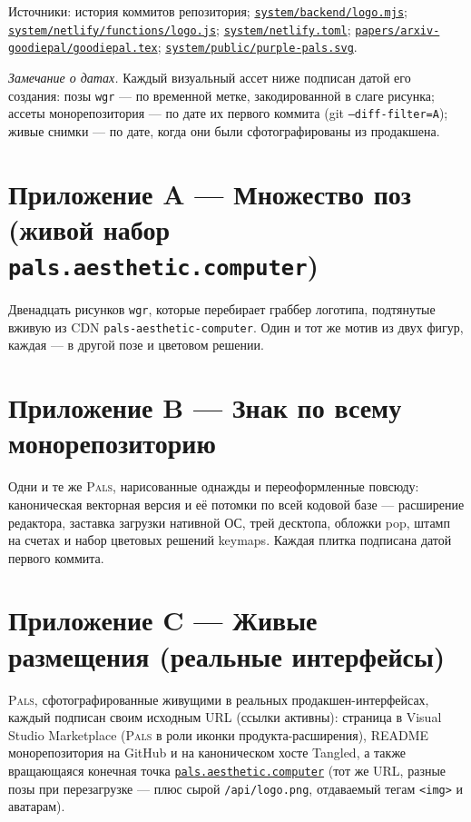 \documentclass[10pt,letterpaper,twocolumn]{article}
\newcommand{\pals}{\textsc{Pals}}
\newcommand{\repofile}[1]{\href{https://github.com/whistlegraph/aesthetic-computer/blob/main/#1}{\texttt{#1}}}
\begin{document}
\vspace{0.6em}
{\footnotesize\color{acgray}\noindent Источники: история коммитов
репозитория;
\repofile{system/backend/logo.mjs};
\repofile{system/netlify/functions/logo.js};
\repofile{system/netlify.toml};
\repofile{papers/arxiv-goodiepal/goodiepal.tex};
\repofile{system/public/purple-pals.svg}.\par}

\onecolumn
\appendix

\noindent\emph{Замечание о датах.} Каждый визуальный ассет ниже подписан
датой его создания: позы \texttt{wgr} --- по временной метке,
закодированной в слаге рисунка; ассеты монорепозитория --- по дате их
первого коммита (git \texttt{--diff-filter=A}); живые снимки --- по дате,
когда они были сфотографированы из продакшена.

\section*{Приложение A --- Множество поз (живой набор \texttt{pals.aesthetic.computer})}
\noindent Двенадцать рисунков \texttt{wgr}, которые перебирает граббер
логотипа, подтянутые вживую из CDN \texttt{pals-aesthetic-computer}. Один и
тот же мотив из двух фигур, каждая --- в другой позе и цветовом решении.
\vspace{1.2em}




\newpage
\section*{Приложение B --- Знак по всему монорепозиторию}
\noindent Одни и те же \pals{}, нарисованные однажды и переоформленные
повсюду: каноническая векторная версия и её потомки по всей кодовой базе
--- расширение редактора, заставка загрузки нативной ОС, трей десктопа,
обложки pop, штамп на счетах и набор цветовых решений keymaps. Каждая
плитка подписана датой первого коммита.
\vspace{1.2em}



\newpage
\section*{Приложение C --- Живые размещения (реальные интерфейсы)}
\noindent \pals{}, сфотографированные живущими в реальных
продакшен-интерфейсах, каждый подписан своим исходным URL (ссылки активны):
страница в Visual Studio Marketplace (\pals{} в роли иконки
продукта-расширения), README монорепозитория на GitHub и на каноническом
хосте Tangled, а также вращающаяся конечная точка
\href{https://pals.aesthetic.computer}{\texttt{pals.aesthetic.computer}}
(тот же URL, разные позы при перезагрузке --- плюс сырой
\texttt{/api/logo.png}, отдаваемый тегам \texttt{<img>} и аватарам).
\vspace{1.0em}


\end{document}
